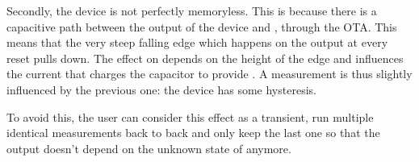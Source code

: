 Secondly, the device is not perfectly memoryless.
This is because there is a capacitive path between the output of the device and , through the OTA.
This means that the very steep falling edge which happens on the output at every reset pulls  down.
The effect on  depends on the height of the edge and influences the current that charges the capacitor to provide .
A measurement is thus slightly influenced by the previous one: the device has some hysteresis.

To avoid this, the user can consider this effect as a transient, run multiple identical measurements back to back and only keep the last one so that the output doesn't depend on the unknown state of  anymore.
